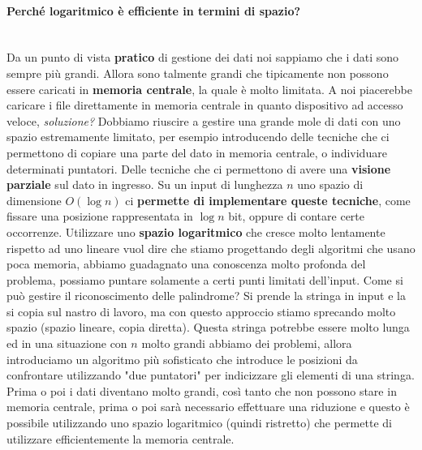 \documentclass{article}
\begin{document}
\paragraph{Perché logaritmico è efficiente in termini di spazio?}\mbox{}\\
Da un punto di vista \textbf{pratico} di gestione dei dati noi sappiamo che i dati sono sempre più grandi.
Allora sono talmente grandi che tipicamente non possono essere caricati in \textbf{memoria centrale}, la quale
è molto limitata.
\newline\newline
A noi piacerebbe caricare i file direttamente in memoria centrale in quanto
dispositivo ad accesso veloce, \textit{soluzione?} Dobbiamo riuscire a gestire una grande
mole di dati con uno spazio estremamente limitato, per esempio introducendo delle tecniche che ci
permettono di copiare una parte del dato in memoria centrale, o individuare determinati puntatori.
\newline\newline
Delle tecniche che ci permettono di avere una \textbf{visione parziale} sul dato in ingresso. Su un input
di lunghezza $n$ uno spazio di dimensione $O(\log n)$ ci \textbf{permette di implementare queste tecniche},
come fissare una posizione rappresentata in $\log n$ bit, oppure di contare certe occorrenze.
\newline\newline
Utilizzare uno \textbf{spazio logaritmico} che cresce molto lentamente rispetto ad uno lineare vuol dire che
stiamo progettando degli algoritmi che usano poca memoria, abbiamo guadagnato una conoscenza
molto profonda del problema, possiamo puntare solamente a certi punti limitati dell'input.
\newline\newline
Come si può gestire il riconoscimento delle palindrome? Si prende la stringa in input e la si copia
sul nastro di lavoro, ma con questo approccio stiamo sprecando molto spazio (spazio lineare, copia
diretta). Questa stringa potrebbe essere molto lunga ed in una situazione con $n$ molto grandi
abbiamo dei problemi, allora introduciamo un algoritmo più sofisticato che introduce
le posizioni da confrontare utilizzando "due puntatori" per indicizzare gli elementi di una stringa.
\newline\newline
Prima o poi i dati diventano molto grandi, così tanto che non possono stare in memoria centrale,
prima o poi sarà necessario effettuare una riduzione e questo è possibile utilizzando uno spazio
logaritmico (quindi ristretto) che permette di utilizzare efficientemente la memoria centrale.
\end{document}

